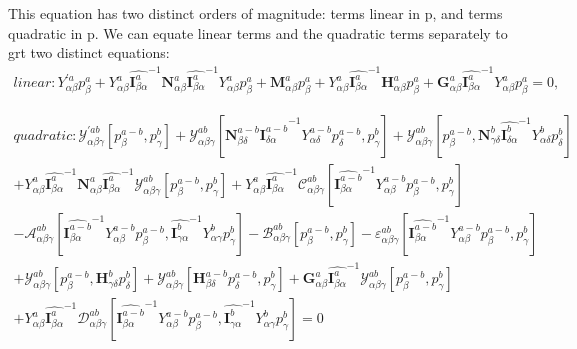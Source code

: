 \documentclass{Note}
\begin{document}
This equation has two distinct orders of magnitude: terms linear in p, and terms quadratic in p. We can equate linear terms and the quadratic terms separately to grt two distinct equations:
 \begin{equation}
\begin{aligned}
linear:{Y}_{\alpha\beta}^{'a} p_{\beta}^a+Y_{\alpha\beta}^{a} {\widehat{\textbf{I}_{\beta \alpha}^a}}^{-1}   \textbf{N}_{\alpha\beta}^a {\widehat{\textbf{I}_{\beta \alpha}^a}}^{-1}  Y_{\alpha\beta}^a p_\beta^a+\textbf{M}_{\alpha\beta}^a p_\beta^a+Y_{\alpha\beta}^{a} {\widehat{\textbf{I}_{\beta \alpha}^a}}^{-1}  \textbf{H}_{\alpha\beta}^a p_\beta^a+ \textbf{G}_{\alpha\beta}^a  {\widehat{\textbf{I}_{\beta \alpha}^a}}^{-1}  Y_{\alpha\beta}^a p_\beta^a=0,
\end{aligned}
\end{equation}


\begin{equation}
\begin{aligned}
quadratic:\mathcal{Y}_{\alpha\beta\gamma}^{'ab}[p_{\beta}^{a-b},p_{\gamma}^{b}]+\mathcal{Y}_{\alpha\beta\gamma}^{ab}[\textbf{N}_{\beta\delta}^{a-b} {\widehat{\textbf{I}_{\delta \alpha}^{a-b}}}^{-1}  Y_{\alpha\delta}^{a-b} p_\delta^{a-b} ,p_{\gamma}^{b}]+\mathcal{Y}_{\alpha\beta\gamma}^{ab}[p_\beta^{a-b},\textbf{N}_{\gamma\delta}^{b} {\widehat{\textbf{I}_{\delta \alpha}^{b}}}^{-1}  Y_{\alpha\delta}^{b} p_\delta^{b} ]\\
+Y_{\alpha\beta}^{a} {\widehat{\textbf{I}_{\beta \alpha}^a}}^{-1}   \textbf{N}_{\alpha\beta}^a {\widehat{\textbf{I}_{\beta \alpha}^a}}^{-1} \mathcal{Y}_{\alpha\beta\gamma}^{ab}[p_{\beta}^{a-b},p_{\gamma}^{b}] +Y_{\alpha\beta}^{a}{\widehat{\textbf{I}_{\beta \alpha}^a}}^{-1}  \mathcal{C}_{\alpha\beta\gamma}^{ab}[{\widehat{\textbf{I}_{\beta \alpha}^{a-b}}}^{-1}  Y_{\alpha\beta}^{a-b} p_\beta^{a-b} ,p_{\gamma}^{b}]\\
-\mathcal{A}_{\alpha\beta\gamma}^{ab}[{\widehat{\textbf{I}_{\beta \alpha}^{a-b}}}^{-1}  Y_{\alpha\beta}^{a-b} p_\beta^{a-b},{\widehat{\textbf{I}_{\gamma \alpha}^{b}}}^{-1}  Y_{\alpha\gamma}^{b} p_\gamma^{b}]-\mathcal{B}_{\alpha\beta\gamma}^{ab}[p_{\beta}^{a-b},p_{\gamma}^{b}]-\varepsilon_{\alpha\beta\gamma}^{ab}[{\widehat{\textbf{I}_{\beta \alpha}^{a-b}}}^{-1}  Y_{\alpha\beta}^{a-b} p_\beta^{a-b} ,p_{\gamma}^{b}]\\
+\mathcal{Y}_{\alpha\beta\gamma}^{ab}[p_\beta^{a-b},\textbf{H}_{\gamma\delta}^{b} p_{\delta}^{b}]+\mathcal{Y}_{\alpha\beta\gamma}^{ab}[\textbf{H}_{\beta\delta}^{a-b} p_{\delta}^{a-b},p_{\gamma}^{b} ]+\textbf{G}_{\alpha\beta}^a  {\widehat{\textbf{I}_{\beta \alpha}^a}}^{-1} \mathcal{Y}_{\alpha\beta\gamma}^{ab}[p_{\beta}^{a-b},p_{\gamma}^{b}] \\
+Y_{\alpha\beta}^{a} {\widehat{\textbf{I}_{\beta \alpha}^a}}^{-1}  \mathcal{D}_{\alpha\beta\gamma}^{ab}[{\widehat{\textbf{I}_{\beta \alpha}^{a-b}}}^{-1}  Y_{\alpha\beta}^{a-b} p_\beta^{a-b},{\widehat{\textbf{I}_{\gamma \alpha}^{b}}}^{-1}  Y_{\alpha\gamma}^{b} p_\gamma^{b}]=0
\end{aligned}
\end{equation}
\end{document}
